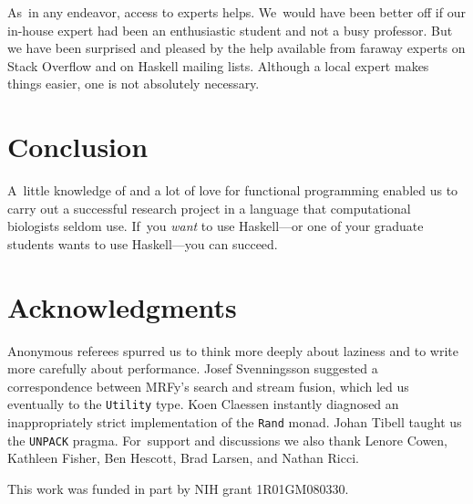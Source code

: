 \documentclass[]{jfp1}
\newcommand\mrfy{MRFy} %
\begin{document}


As~in any endeavor, access to experts helps.
We~would have been better off if our in-house expert had been an
enthusiastic student and not a busy professor.
But we have been surprised and pleased by the help available from
faraway experts on Stack Overflow and on Haskell mailing lists.
Although a local expert makes things easier, one is not
 absolutely necessary.

\section{Conclusion}

A~little knowledge of and a lot of love for functional programming
enabled us to carry out a successful research project in a language
that computational biologists seldom use.
If~you \emph{want} to use Haskell---or one of your graduate students
wants to use Haskell---you can
succeed. 




%  

 

\section*{Acknowledgments}

Anonymous referees spurred us to think
more deeply about laziness and to write more carefully about performance.
Josef Svenningsson suggested a correspondence between \mrfy's search
and stream fusion, which led us eventually to the \texttt{Utility} type.
Koen Claessen instantly diagnosed an inappropriately strict
implementation of the \texttt{Rand} monad.
Johan Tibell taught us the \texttt{UNPACK} pragma.
For~support and discussions 
we also thank Lenore Cowen, Kathleen Fisher, Ben Hescott, Brad
Larsen, and Nathan Ricci.

This work was funded in part by NIH grant 1R01GM080330.
\end{document}

